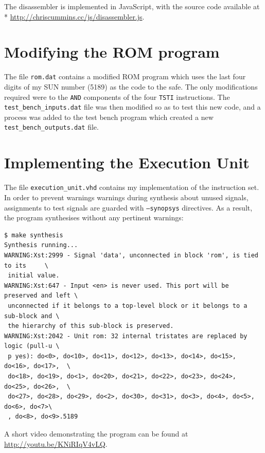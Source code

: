 \documentclass[12pt,a4paper]{article}
\begin{document}
The disassembler is implemented in JavaScript, with the source code
available at\\* \url{http://chriscummins.cc/js/disassembler.js}.

\section{Modifying the ROM program}

The file \texttt{rom.dat} contains a modified ROM program which uses
the last four digits of my SUN number (5189) as the code to the
safe. The only modifications required were to the \texttt{AND}
components of the four \texttt{TSTI} instructions. The
\texttt{test\_bench\_inputs.dat} file was then modified so as to test
this new code, and a process was added to the test bench program which
created a new \texttt{test\_bench\_outputs.dat} file.

\section{Implementing the Execution Unit}

The file \texttt{execution\_unit.vhd} contains my implementation of
the instruction set. In order to prevent warnings warnings during
synthesis about unused signals, assignments to test signals are
guarded with \texttt{--synopsys} directives. As a result, the program synthesises
without any pertinent warnings:

\begin{verbatim}
$ make synthesis
Synthesis running...
WARNING:Xst:2999 - Signal 'data', unconnected in block 'rom', is tied to its     \
 initial value.
WARNING:Xst:647 - Input <en> is never used. This port will be preserved and left \
 unconnected if it belongs to a top-level block or it belongs to a sub-block and \
 the hierarchy of this sub-block is preserved.
WARNING:Xst:2042 - Unit rom: 32 internal tristates are replaced by logic (pull-u \
 p yes): do<0>, do<10>, do<11>, do<12>, do<13>, do<14>, do<15>, do<16>, do<17>,  \
 do<18>, do<19>, do<1>, do<20>, do<21>, do<22>, do<23>, do<24>, do<25>, do<26>,  \
 do<27>, do<28>, do<29>, do<2>, do<30>, do<31>, do<3>, do<4>, do<5>, do<6>, do<7>\
 , do<8>, do<9>.5189
\end{verbatim}

A short video demonstrating the program can be found at
\url{http://youtu.be/KNiRIqV4vLQ}.
\end{document}
